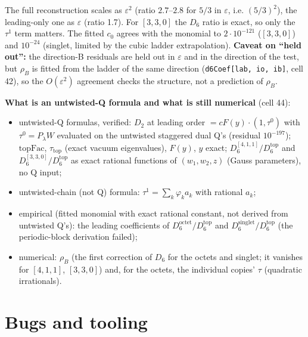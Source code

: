 \documentclass[10pt]{article}
\newcommand{\nb}[1]{\texttt{#1}}
\begin{document}
The full reconstruction scales as $\varepsilon^2$ (ratio $2.7$--$2.8$ for $5/3$ in $\varepsilon$, i.e. $(5/3)^2$), the leading-only one as $\varepsilon$ (ratio 1.7). For $[3,3,0]$ the $D_6$ ratio is exact, so only the $\tau^1$ term matters. The fitted $c_0$ agrees with the monomial to $2\cdot10^{-121}$ ($[3,3,0]$) and $10^{-24}$ (singlet, limited by the cubic ladder extrapolation). \textbf{Caveat on ``held out'':} the direction-B residuals are held out in $\varepsilon$ and in the direction of the test, but $\rho_B$ is fitted from the ladder of the same direction (\nb{d6Coef[lab, io, ib]}, cell 42), so the $O(\varepsilon^2)$ agreement checks the structure, not a prediction of $\rho_B$.

\textbf{What is an untwisted-Q formula and what is still numerical} (cell 44):

\begin{itemize}\setlength{\itemsep}{1pt}
\item untwisted-Q formulas, verified: $D_2$ at leading order $=cF(y)\cdot(1,\tau^0)$ with $\tau^0=P_\lambda W$ evaluated on the untwisted staggered dual Q's (residual $10^{-197}$); $\mathrm{topFac}$, $\tau_{\mathrm{top}}$ (exact vacuum eigenvalues), $F(y)$, $y$ exact; $D_6^{[4,1,1]}/D_6^{\mathrm{top}}$ and $D_6^{[3,3,0]}/D_6^{\mathrm{top}}$ as exact rational functions of $(w_1,w_2,z)$ (Gauss parameters), no Q input;
\item untwisted-chain (not Q) formula: $\tau^1=\sum_k\varphi_ka_k$ with rational $a_k$;
\item empirical (fitted monomial with exact rational constant, not derived from untwisted Q's): the leading coefficients of $D_6^{\mathrm{octet}}/D_6^{\mathrm{top}}$ and $D_6^{\mathrm{singlet}}/D_6^{\mathrm{top}}$ (the periodic-block derivation failed);
\item numerical: $\rho_B$ (the first correction of $D_6$ for the octets and singlet; it vanishes for $[4,1,1]$, $[3,3,0]$) and, for the octets, the individual copies' $\tau$ (quadratic irrationals).
\end{itemize}

\section{Bugs and tooling}\label{sec:tools}
\end{document}
